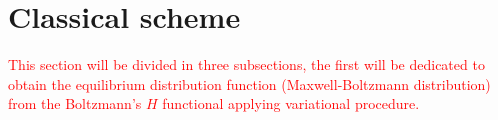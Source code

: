 \documentclass{article}
\begin{document}



\section{Classical scheme}
\textcolor{red}{This section will be divided in three subsections, the first will be dedicated to obtain the equilibrium distribution function (Maxwell-Boltzmann distribution) from the Boltzmann's $H$ functional applying variational procedure.}
\end{document}
